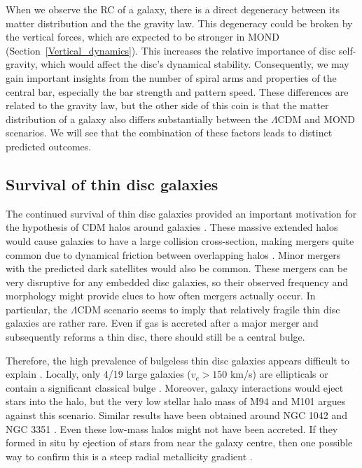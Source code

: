 \documentclass[fleqn,usenatbib,useAMS,onecolumn]{mnras} %
\begin{document}
When we observe the RC of a galaxy, there is a direct degeneracy between its matter distribution and the the gravity law. This degeneracy could be broken by the vertical forces, which are expected to be stronger in MOND (Section~\ref{Vertical_dynamics}). This increases the relative importance of disc self-gravity, which would affect the disc's dynamical stability. Consequently, we may gain important insights from the number of spiral arms and properties of the central bar, especially the bar strength and pattern speed. These differences are related to the gravity law, but the other side of this coin is that the matter distribution of a galaxy also differs substantially between the $\Lambda$CDM and MOND scenarios. We will see that the combination of these factors leads to distinct predicted outcomes.



\subsection{Survival of thin disc galaxies}
\label{Thin_disc_survival}

The continued survival of thin disc galaxies provided an important motivation for the hypothesis of CDM halos around galaxies \citep{Hohl_1971, Ostriker_Peebles_1973}. These massive extended halos would cause galaxies to have a large collision cross-section, making mergers quite common due to dynamical friction between overlapping halos \citep{Privon_2013, Kroupa_2015}. Minor mergers with the predicted dark satellites would also be common. These mergers can be very disruptive for any embedded disc galaxies, so their observed frequency and morphology might provide clues to how often mergers actually occur. In particular, the $\Lambda$CDM scenario seems to imply that relatively fragile thin disc galaxies are rather rare. Even if gas is accreted after a major merger and subsequently reforms a thin disc, there should still be a central bulge.

Therefore, the high prevalence of bulgeless thin disc galaxies appears difficult to explain \citep{Kautsch_2006, Graham_2008}. Locally, only 4/19 large galaxies ($v_c > 150$ km/s) are ellipticals or contain a significant classical bulge \citep{Kormendy_2010}. Moreover, galaxy interactions would eject stars into the halo, but the very low stellar halo mass of M94 \citep{Smercina_2018} and M101 \citep{van_Dokkum_2014} argues against this scenario. Similar results have been obtained around NGC 1042 and NGC 3351 \citep{Merritt_2016}. Even these low-mass halos might not have been accreted. If they formed in situ by ejection of stars from near the galaxy centre, then one possible way to confirm this is a steep radial metallicity gradient \citep{Elias_2018}.
\end{document}
